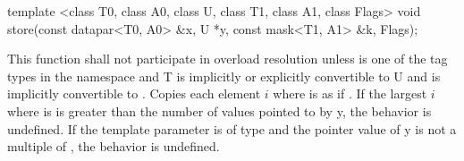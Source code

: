 \begin{itemdecl}
template <class T0, class A0, class U, class T1, class A1, class Flags>
void store(const datapar<T0, A0> &x, U *y, const mask<T1, A1> &k, Flags);
\end{itemdecl}
\begin{itemdescr}
  \pnum\remarks This function shall not participate in overload resolution unless  is one of the tag types in the  namespace and \type T is implicitly or explicitly convertible to \type U and \mask[<T1, A1>] is implicitly convertible to \mask[<T0, A0>].
  \pnum\effects Copies each element $i$ where  is \true as if  \foralli.
  \pnum\remarks If the largest $i$ where  is \true is greater than the number of values pointed to by \code y, the behavior is undefined.
  \pnum\remarks If the  template parameter is of type  and the pointer value of \code y is not a multiple of , the behavior is undefined.
\end{itemdescr}

